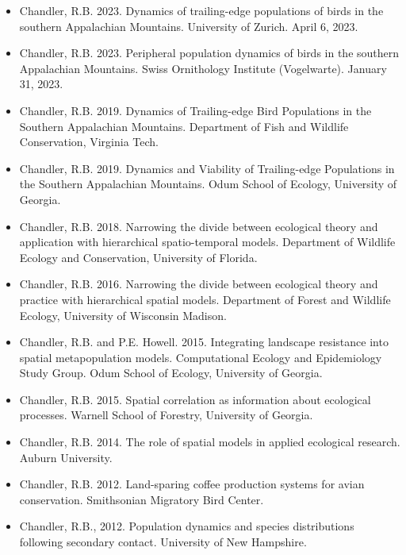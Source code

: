 \documentclass[12pt]{article}
\begin{document}
\begin{itemize}

\item Chandler, R.B. 2023. Dynamics of trailing-edge populations of
  birds in the southern Appalachian Mountains. University of
  Zurich. April 6, 2023.

\item Chandler, R.B. 2023. Peripheral population dynamics of birds in
  the southern Appalachian Mountains. Swiss Ornithology Institute
  (Vogelwarte). January 31, 2023.
  
\item Chandler, R.B. 2019. Dynamics of Trailing-edge Bird Populations
  in the Southern Appalachian Mountains. Department of Fish and
  Wildlife Conservation, Virginia Tech.

\item Chandler, R.B. 2019. Dynamics and Viability of Trailing-edge
  Populations in the Southern Appalachian Mountains. Odum School of
  Ecology, University of Georgia.

\item Chandler, R.B. 2018. Narrowing the divide between ecological
  theory and application with hierarchical spatio-temporal
  models. Department of Wildlife Ecology and Conservation, 
  University of Florida.

\item Chandler, R.B. 2016. Narrowing the divide between ecological
  theory and practice with hierarchical spatial models. Department of
  Forest and Wildlife Ecology, University of Wisconsin Madison. 

\item Chandler, R.B. and P.E. Howell. 2015. Integrating landscape
  resistance into spatial metapopulation models. Computational Ecology
  and Epidemiology Study Group. Odum School of Ecology, University of
  Georgia. 

\item Chandler, R.B. 2015. Spatial correlation as information about
  ecological processes. Warnell School of Forestry, University of
  Georgia. 

\item Chandler, R.B. 2014. The role of spatial models in applied
  ecological research. Auburn University.

\item Chandler, R.B. 2012. Land-sparing coffee production systems for avian
  conservation. Smithsonian Migratory Bird Center. 

\item Chandler, R.B., 2012. Population dynamics and species
  distributions following secondary contact. University of New
  Hampshire. 

\end{itemize}
\end{document}
